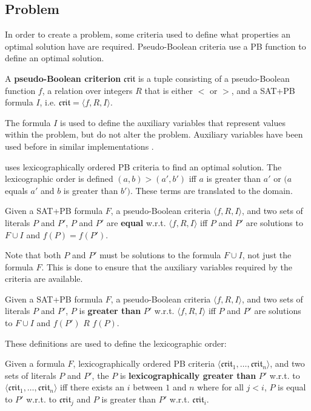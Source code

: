 \subsection{\modelimpl Problem}
\label{impl.lexsatproblem}
In order to create a \modelimpl problem, some criteria used to define what properties an optimal solution have are required.
Pseudo-Boolean criteria use a PB function to define an optimal solution.

\begin{defs}
A \textbf{pseudo-Boolean criterion} $\mathfrak{crit}$ is a tuple consisting of a pseudo-Boolean function $f$,
a relation over integers $R$ that is either $<$ or $>$, and a SAT+PB formula $I$,
i.e. $\mathfrak{crit} = \langle f, R , I \rangle$.
\end{defs}
The formula $I$ is used to define the auxiliary variables that represent values within the problem, but do not alter the problem.
Auxiliary variables have been used before in similar implementations \citep{argelich2010solving}.


\modelimpl uses lexicographically ordered PB criteria to find an optimal solution.
The lexicographic order is defined $(a,b) > (a',b')$ iff $a$ is greater than $a'$ or $(a$ equals $a'$ and $b$ is greater than $b')$.
These terms are translated to the \modelimpl domain.
\begin{defs}
Given a SAT+PB formula $F$, a pseudo-Boolean criteria $\langle f,R, I \rangle$, and two sets of literals $P$ and $P'$, 
$P$ and $P'$ are \textbf{equal} w.r.t. $\langle f,R, I \rangle$
iff $P$ and $P'$ are solutions to $F \cup I$ and $f(P) = f(P')$.
\end{defs}
Note that both $P$ and $P'$ must be solutions to the formula $F \cup I$, not just the formula $F$.
This is done to ensure that the auxiliary variables required by the criteria are available.

\begin{defs}
Given a SAT+PB formula $F$, a pseudo-Boolean criteria $\langle f,R, I \rangle$, and two sets of literals $P$ and $P'$, 
$P$ is \textbf{greater than}  $P'$ w.r.t. $\langle f,R, I \rangle$
iff $P$ and $P'$ are solutions to $F \cup I$ and $f(P')$ $R$ $f(P)$.
\end{defs}

These definitions are used to define the lexicographic order:
\begin{defs}
Given a formula $F$, lexicographically ordered PB criteria $\langle \mathfrak{crit}_1,\ldots,\mathfrak{crit}_n \rangle$, and two sets of literals $P$ and $P'$,
the $P$ is \textbf{lexicographically greater than}  $P'$ w.r.t. to $\langle \mathfrak{crit}_1,\ldots,\mathfrak{crit}_n \rangle$
iff there exists an $i$ between $1$ and $n$ where for all $j < i$, $P$ is equal to $P'$ w.r.t. to $\mathfrak{crit}_j$ and $P$ is greater than $P'$ w.r.t. $\mathfrak{crit}_i$.
\end{defs}


